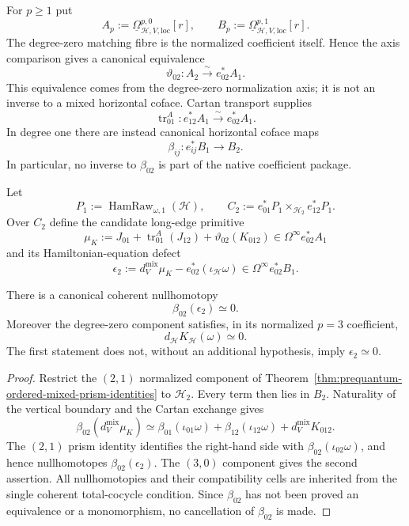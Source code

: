 For $p\ge1$ put
\[
A_p:=\underline\Omega^{p,0}_{\mathcal H,V,\mathrm{loc}}[r],
\qquad
B_p:=\underline\Omega^{p,1}_{\mathcal H,V,\mathrm{loc}}[r].
\]
The degree-zero matching fibre is the normalized coefficient itself.  Hence the
axis comparison gives a canonical equivalence
\[
\vartheta_{02}:A_2\xrightarrow{\sim}e_{02}^*A_1.
\]
This equivalence comes from the degree-zero normalization axis; it is not an
inverse to a mixed horizontal coface.  Cartan transport supplies
\[
\operatorname{tr}_{01}^A:e_{12}^*A_1\xrightarrow{\sim}e_{02}^*A_1.
\]
In degree one there are instead canonical horizontal coface maps
\[
\beta_{ij}:e_{ij}^*B_1\longrightarrow B_2.
\]
In particular, no inverse to $\beta_{02}$ is part of the native coefficient
package.

Let
\[
P_1:=\operatorname{HamRaw}_{\omega,1}(\mathcal H),
\qquad
C_2:=e_{01}^*P_1\times_{\mathcal H_2}e_{12}^*P_1.
\]
Over $C_2$ define the candidate long-edge primitive
\[
\mu_K
:=
J_{01}+\operatorname{tr}_{01}^A(J_{12})
+\vartheta_{02}(K_{012})
\in\Omega^\infty e_{02}^*A_1
\]
and its Hamiltonian-equation defect
\[
\epsilon_2
:=
d_V^{\mathrm{mix}}\mu_K-e_{02}^*(\iota_{\mathcal H}\omega)
\in\Omega^\infty e_{02}^*B_1.
\]

\begin{lemma}
\label{lem:prequantum-hamiltonian-composition-correction}
There is a canonical coherent nullhomotopy
\[
\boxed{
\beta_{02}(\epsilon_2)\simeq0.
}
\]
Moreover the degree-zero component satisfies, in its normalized
$p=3$ coefficient,
\[
\boxed{
d_{\mathcal H}K_{\mathcal H}(\omega)\simeq0.
}
\]
The first statement does not, without an additional hypothesis, imply
$\epsilon_2\simeq0$.
\end{lemma}

\begin{proof}
Restrict the $(2,1)$ normalized component of
Theorem~\ref{thm:prequantum-ordered-mixed-prism-identities} to
$\mathcal H_2$.  Every term then lies in $B_2$.  Naturality of the vertical
boundary and the Cartan exchange gives
\[
\beta_{02}(d_V^{\mathrm{mix}}\mu_K)
\simeq
\beta_{01}(\iota_{01}\omega)
+\beta_{12}(\iota_{12}\omega)
+d_V^{\mathrm{mix}}K_{012}.
\]
The $(2,1)$ prism identity identifies the right-hand side with
$\beta_{02}(\iota_{02}\omega)$, and hence nullhomotopes
$\beta_{02}(\epsilon_2)$.  The $(3,0)$ component gives the second assertion.
All nullhomotopies and their compatibility cells are inherited from the single
coherent total-cocycle condition.  Since $\beta_{02}$ has not been proved an
equivalence or a monomorphism, no cancellation of $\beta_{02}$ is made.
\end{proof}

